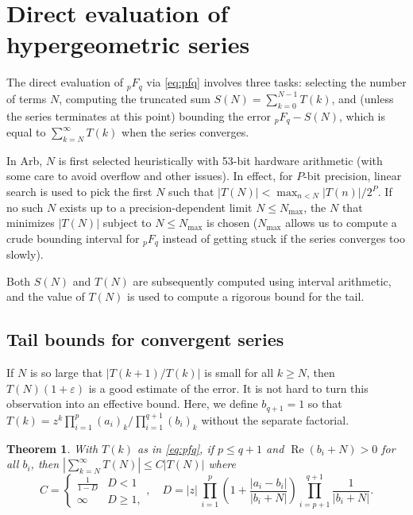 \documentclass[11pt,a4paper]{article}
\newtheorem{theorem}{Theorem}
\begin{document}
\section{Direct evaluation of hypergeometric series}

\label{sect:hypdirsum}

The direct evaluation of ${}_pF_q$ via \eqref{eq:pfq}
involves three tasks: selecting the number of terms $N$,
computing the truncated sum $S(N) = \sum_{k=0}^{N-1} T(k)$, and
(unless the series terminates at this point) bounding the error
${}_pF_q - S(N)$, which is equal to $\sum_{k=N}^{\infty} T(k)$ when
the series converges.

In Arb, $N$ is first selected heuristically with
53-bit hardware arithmetic (with some care to avoid overflow and other issues).
In effect, for $P$-bit precision,
linear search is used to pick the first $N$ such that
$|T(N)| < \max_{n < N} |T(n)| / 2^P$.
If no such $N$ exists up to a precision-dependent limit $N \le N_{\text{max}}$,
the $N$ that minimizes $|T(N)|$ subject to $N \le N_{\text{max}}$ is chosen
($N_{\text{max}}$
allows us to compute a crude bounding interval for
${}_pF_q$ instead of getting stuck if the series converges too slowly).

Both $S(N)$ and $T(N)$ are subsequently computed
using interval arithmetic, and the value of $T(N)$ is used to compute a
rigorous bound for the tail.

\subsection{Tail bounds for convergent series}

\label{sect:tails}

If $N$ is so large that $|T(k+1)/T(k)|$ is small for all $k \ge N$,
then $T(N) (1 + \varepsilon)$ is a good
estimate of the error.
It is not hard to turn this observation into an effective bound.
Here, we define $b_{q+1} = 1$ so that
$T(k) = z^k \prod_{i=1}^p (a_i)_k / \prod_{i=1}^{q+1} (b_i)_k$
without the separate factorial.

\begin{theorem}
\label{thm:pfqbound}
With $T(k)$ as in \eqref{eq:pfq},
if $p \le q + 1$ and $\operatorname{Re}(b_i+N) > 0$ for all $b_i$,
then $\left|\sum_{k=N}^{\infty} T(N)\right| \le C |T(N)|$ where
\begin{equation*}
C = \begin{cases} \frac{1}{1-D} & D < 1 \\ \infty & D \ge 1, \end{cases}, \quad
D = |z| \, \prod_{i=1}^p \left(1 + \frac{|a_i-b_i|}{|b_i+N|}\right) \prod_{i=p+1}^{q+1} \frac{1}{|b_i + N|}.
\end{equation*}
\end{theorem}
\end{document}
